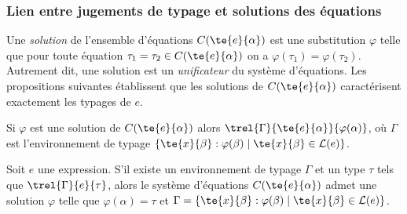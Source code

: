 %
\begin{frame}
\frametitle{Lien entre jugements de typage et solutions des équations}

Une \emph{solution} de l'ensemble d'équations $C(\te{e}{\alpha})$ est
une substitution $\varphi$ telle que pour toute équation $\tau_1 =
\tau_2 \in C(\te{e}{\alpha})$ on a $\varphi(\tau_1) =
\varphi(\tau_2)$. Autrement dit, une solution est un
\emph{unificateur} du système d'équations. Les propositions suivantes
établissent que les solutions de $C(\te{e}{\alpha})$ caractérisent
exactement les typages de $e$.

\begin{Prop}
Si $\varphi$ est une solution de $C(\te{e}{\alpha})$ alors
$\trel{\Gamma}{\te{e}{\alpha}}{\varphi(\alpha)}$, où $\Gamma$ est
l'environnement de typage $\{\te{x}{\beta}:\varphi(\beta) \mid
\te{x}{\beta} \in {\cal L} (e)\}$.
\end{Prop}

\begin{Prop}
Soit $e$ une expression. S'il existe un environnement de typage
$\Gamma$ et un type $\tau$ tels que $\trel{\Gamma}{e}{\tau}$, alors le
système d'équations $C(\te{e}{\alpha})$ admet une solution $\varphi$
telle que $\varphi(\alpha) = \tau$ et $\Gamma =
\{\te{x}{\beta}:\varphi(\beta) \mid \te{x}{\beta} \in {\cal L} (e)\}$.
\end{Prop}

\end{frame}

